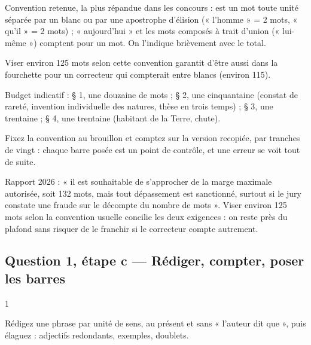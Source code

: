 \documentclass[11pt,a4paper]{article}
\begin{document}
Convention retenue, la plus répandue dans les concours : est un mot toute unité séparée par un blanc ou par une apostrophe d'élision (« l'homme » = 2 mots, « qu'il » = 2 mots) ; « aujourd'hui » et les mots composés à trait d'union (« lui-même ») comptent pour un mot. On l'indique brièvement avec le total.

Viser environ 125 mots selon cette convention garantit d'être aussi dans la fourchette pour un correcteur qui compterait entre blancs (environ 115).

Budget indicatif : § 1, une douzaine de mots ; § 2, une cinquantaine (constat de rareté, invention individuelle des natures, thèse en trois temps) ; § 3, une trentaine ; § 4, une trentaine (habitant de la Terre, chute).

\begin{methode}

Fixez la convention au brouillon et comptez sur la version recopiée, par tranches de vingt : chaque barre posée est un point de contrôle, et une erreur se voit tout de suite.

\end{methode}

\begin{jury}

Rapport 2026 : « il est souhaitable de s'approcher de la marge maximale autorisée, soit 132 mots, mais tout dépassement est sanctionné, surtout si le jury constate une fraude sur le décompte du nombre de mots ». Viser environ 125 mots selon la convention usuelle concilie les deux exigences : on reste près du plafond sans risquer de le franchir si le correcteur compte autrement.

\end{jury}

\hypertarget{question-1-uxe9tape-c-ruxe9diger-compter-poser-les-barres}{%
\subsection{Question 1, étape c --- Rédiger, compter, poser les barres}\label{question-1-uxe9tape-c-ruxe9diger-compter-poser-les-barres}}

\begin{indication}{1}

Rédigez une phrase par unité de sens, au présent et sans « l'auteur dit que », puis élaguez : adjectifs redondants, exemples, doublets.

\end{indication}
\end{document}

